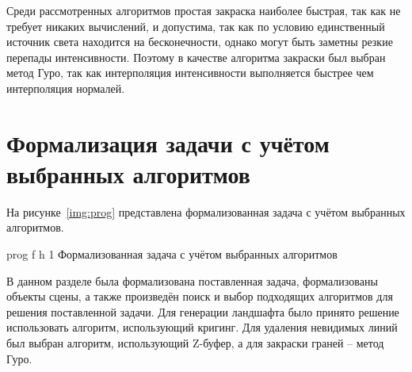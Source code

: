 Среди рассмотренных алгоритмов простая закраска наиболее быстрая, так как не требует никаких вычислений, и допустима, так как по условию единственный источник света находится на бесконечности, однако могут быть заметны резкие перепады интенсивности. Поэтому в качестве алгоритма закраски был выбран метод Гуро, так как интерполяция интенсивности выполняется быстрее чем интерполяция нормалей.

\section{Формализация задачи с учётом выбранных алгоритмов}

На рисунке~\ref{img:prog} представлена формализованная задача с учётом выбранных алгоритмов.

\FloatBarrier
{}
{prog} %
{f} %
{h} %
{1\textwidth} %
{Формализованная задача с учётом выбранных алгоритмов} %
\FloatBarrier

\clearpage


В данном разделе была формализована поставленная задача, формализованы объекты сцены, а также произведён поиск и выбор подходящих алгоритмов для решения поставленной задачи. Для генерации ландшафта было принято решение использовать алгоритм, использующий кригинг. Для удаления невидимых линий был выбран алгоритм, использующий Z-буфер, а для закраски граней -- метод Гуро.